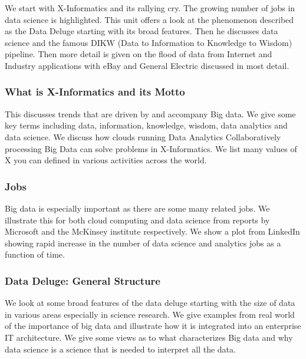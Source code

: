 We start with X-Informatics and its rallying cry. The growing number of
jobs in data science is highlighted. This unit offers a look at the
phenomenon described as the Data Deluge starting with its broad
features. Then he discusses data science and the famous DIKW (Data to
Information to Knowledge to Wisdom) pipeline. Then more detail is given
on the flood of data from Internet and Industry applications with eBay
and General Electric discussed in most detail.




\subsubsection{What is X-Informatics and its
Motto}\label{what-is-x-informatics-and-its-motto}

This discusses trends that are driven by and accompany Big data. We
give some key terms including data, information, knowledge, wisdom,
data analytics and data science. We discuss how clouds running Data Analytics
Collaboratively processing Big Data can solve problems in
X-Informatics. We list many values of X you can defined in various
activities across the world.






\subsubsection{Jobs}\label{jobs}

Big data is especially important as there are some many related jobs. We
illustrate this for both cloud computing and data science from reports
by Microsoft and the McKinsey institute respectively. We show a plot
from LinkedIn showing rapid increase in the number of data science and
analytics jobs as a function of time.



\subsubsection{Data Deluge: General
Structure}\label{data-deluge-general-structure}

We look at some broad features of the data deluge starting with the size
of data in various areas especially in science research. We give
examples from real world of the importance of big data and illustrate
how it is integrated into an enterprise IT architecture. We give some
views as to what characterizes Big data and why data science is a
science that is needed to interpret all the data.


